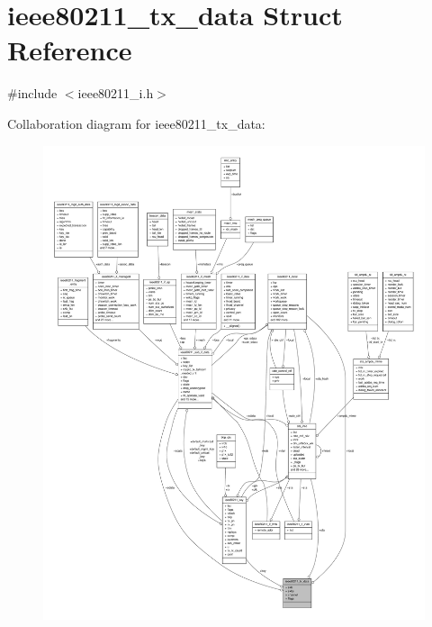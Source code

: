 \hypertarget{structieee80211__tx__data}{\section{ieee80211\-\_\-tx\-\_\-data Struct Reference}
\label{structieee80211__tx__data}
}


{\ttfamily \#include $<$ieee80211\-\_\-i.\-h$>$}



Collaboration diagram for ieee80211\-\_\-tx\-\_\-data\-:
\nopagebreak
\begin{figure}[H]
\begin{center}
\leavevmode
\includegraphics[width=350pt]{structieee80211__tx__data__coll__graph}
\end{center}
\end{figure}
